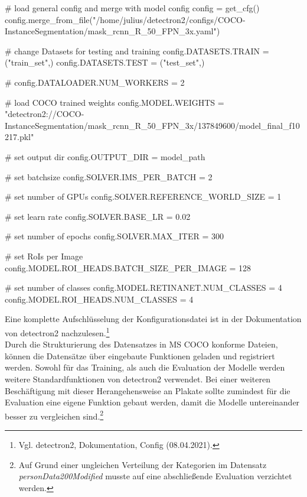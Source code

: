 \documentclass[a4paper,12pt,ngerman]{article}
\begin{document}
\begin{python}
# load general config and merge with model config
config = get_cfg()
config.merge_from_file("/home/julius/detectron2/configs/COCO-InstanceSegmentation/mask_rcnn_R_50_FPN_3x.yaml")

# change Datasets for testing and training
config.DATASETS.TRAIN = ("train_set",)
config.DATASETS.TEST = ("test_set",)

# config.DATALOADER.NUM_WORKERS = 2

# load COCO trained weights 
config.MODEL.WEIGHTS = "detectron2://COCO-InstanceSegmentation/mask_rcnn_R_50_FPN_3x/137849600/model_final_f10217.pkl"

# set output dir
config.OUTPUT_DIR = model_path

# set batchsize
config.SOLVER.IMS_PER_BATCH = 2

# set number of GPUs
config.SOLVER.REFERENCE_WORLD_SIZE = 1

# set learn rate
config.SOLVER.BASE_LR = 0.02

# set number of epochs
config.SOLVER.MAX_ITER = 300

# set RoIs per Image
config.MODEL.ROI_HEADS.BATCH_SIZE_PER_IMAGE = 128

# set number of classes
config.MODEL.RETINANET.NUM_CLASSES = 4
config.MODEL.ROI_HEADS.NUM_CLASSES = 4
\end{python}

Eine komplette Aufschlüsselung der Konfigurationsdatei ist in der Dokumentation von detectron2 nachzulesen.\footnote{Vgl. detectron2, Dokumentation, Config (08.04.2021).} \\

Durch die Strukturierung des Datensatzes in MS COCO konforme Dateien, können die Datensätze über eingebaute Funktionen geladen und registriert werden. Sowohl für das Training, als auch die Evaluation der Modelle werden weitere Standardfunktionen von detectron2 verwendet. Bei einer weiteren Beschäftigung mit dieser Herangehensweise an Plakate sollte zumindest für die Evaluation eine eigene Funktion gebaut werden, damit die Modelle untereinander besser zu vergleichen sind.\footnote{Auf Grund einer ungleichen Verteilung der Kategorien im Datensatz \textit{personData200Modified} musste auf eine abschließende Evaluation verzichtet werden.} \\
\end{document}
